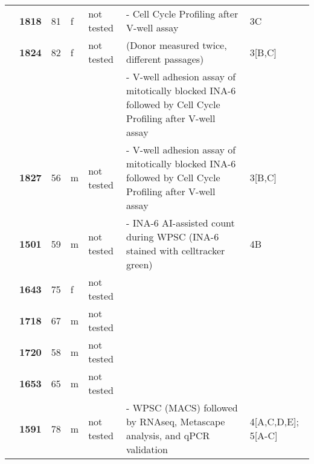 {\begin{longtable}{|>{\bfseries}p{1.5cm}|>{\bfseries}p{1.2cm}|p{1cm}|p{1cm}|p{2.3cm}|p{6cm}|p{1.7cm}|}
    \hhline{~------}
                      & 1818  & 81 & f & not tested & - Cell Cycle Profiling after V-well assay                                                                & 3C                                      \\
    \hhline{~------}
                      & 1824  & 82 & f & not tested & (Donor measured twice, different passages)                                                               & 3[B,C]                                  \\
                      &       &    &   &            & - V-well adhesion assay of mitotically blocked INA-6 followed by Cell Cycle Profiling after V-well assay &                                         \\
    \hhline{~----~~}
                      & 1827  & 56 & m & not tested & - V-well adhesion assay of mitotically blocked INA-6 followed by Cell Cycle Profiling after V-well assay & 3[B,C]                                  \\
    \hhline{~------}
                      & 1501  & 59 & m & not tested & - INA-6 AI-assisted count during WPSC (INA-6 stained with celltracker green)                             & 4B                                      \\
    \hhline{~----~~}
                      & 1643  & 75 & f & not tested &                                                                                                          &                                         \\
    \hhline{~----~~}
                      & 1718  & 67 & m & not tested &                                                                                                          &                                         \\
    \hhline{~----~~}
                      & 1720  & 58 & m & not tested &                                                                                                          &                                         \\
    \hhline{~----~~}
                      & 1653  & 65 & m & not tested &                                                                                                          &                                         \\
    \hhline{~------}
                      & 1591  & 78 & m & not tested & - WPSC (MACS) followed by RNAseq, Metascape analysis, and qPCR validation                                & 4[A,C,D,E]; 5[A-C]                      \\

\end{longtable}}

